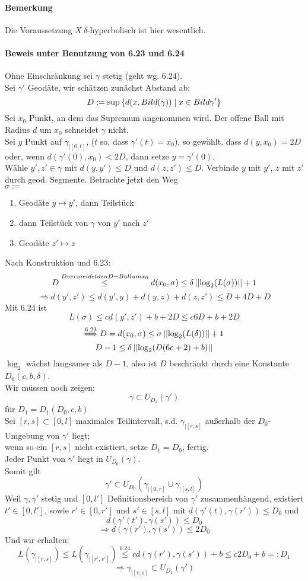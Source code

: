 \documentclass{article}
\begin{document}
\paragraph{Bemerkung} Die Voraussetzung $X ~\delta$-hyperbolisch ist hier wesentlich.

\paragraph{Beweis unter Benutzung von 6.23 und 6.24}
Ohne Einschränkung sei $\gamma$ stetig (geht wg. 6.24).\\
Sei $\gamma'$ Geodäte, wir schätzen zunächst Abstand ab:
\[D:= \sup\set{d(x, Bild(\gamma))}{ x\in Bild\gamma' } \]
Sei $x_0$ Punkt, an dem das Supremum angenommen wird. Der offene Ball mit Radius $d$ um $x_0$ schneidet $\gamma$ nicht.\\
Sei $y$ Punkt auf $\gamma_{|[0,t]}$, ($t$ so, dass $\gamma'(t) = x_0$), so gewählt, dass $d(y,x_0) = 2D$ oder, wenn $d(\gamma'(0), x_0)< 2D$, dann setze $y = \gamma'(0)$.\\
Wähle $y',z' \in \gamma$ mit $d(y,y') \leq D$ und $d(z,z') \leq D$. Verbinde $y$ mit $y'$, $z$ mit $z'$ durch geod. Segmente. Betrachte jetzt den Weg\\
$\sigma := $
\begin{enumerate}
	\item Geodäte $y\mapsto y'$, dann Teilstück  
	\item dann Teilstück von $\gamma$ von $y'$ nach $z'$
	\item Geodäte $z'\mapsto z$
\end{enumerate}
Nach Konstruktion und 6.23:
\[D \overset{D vermeidet den D-Ball um x_0 }{\leq} d(x_0, \sigma) \leq \delta \left|\left|\log_2(L(\sigma))\right|\right| + 1 \]
\[\Longrightarrow d(y',z') \leq d(y',y) + d(y,z) + d(z,z') \leq D + 4D+ D \]
Mit 6.24 ist
\[L(\sigma) \leq cd(y',z') + b + 2D \leq c6D + b +2D\]
\[\overset{6.23}{\Longrightarrow} D = d(x_0, \sigma) \leq \sigma \left|\left|\log_2(L(\delta))\right|\right| + 1 \]
\[ D- 1 \leq \delta \left|\left|\log_2(D(6c + 2) + b)\right|\right| \]
$\log_2$ wächst langsamer als $D-1$, also ist $D$ beschränkt durch eine Konstante $D_0(c,b,\delta)$.\\
Wir müssen noch zeigen: 
\[\gamma \subset U_{D_1}(\gamma') \]
für $D_1 = D_1(D_0, c,b)$\\
Sei $[r,s] \subset [0,l]$ maximales Teilintervall, s.d. $\gamma_{|[r,s]}$ außerhalb der $D_0$-Umgebung von $\gamma'$ liegt;\\
wenn so ein $[r,s]$ nicht existiert, setze $D_1 = D_0$, fertig.\\
Jeder Punkt von $\gamma'$ liegt in $U_{D_0} (\gamma)$.\\
Somit gilt
\[ \gamma' \subset U_{D_0}(\gamma_{|[0,r]} \cup \gamma_{|[s,l]}) \]
Weil $\gamma, \gamma'$ stetig und $[0,l']$ Definitionsbereich von $\gamma'$ zusammenhängend, existiert $t'\in [0,l']$, sowie $r'\in [0,r']$ und $s' \in [s,l]$ mit $d(\gamma'(t), \gamma(r')) \leq D_0$ und
\[ d(\gamma'(t'), \gamma(s')) \leq D_0 \]
\[\Longrightarrow d(\gamma(r'), \gamma(s')) \leq 2D_0 \]
Und wir erhalten: 
\[ L(\gamma_{|[r,s]}) \leq L(\gamma_{|[r',s']}) \overset{6.24}{\leq} cd(\gamma(r'), \gamma(s')) + b \leq c2D_0 + b=:D_1 \]
\[\Longrightarrow \gamma_{|[r,s]} \subset U_{D_1}(\gamma')  \]
\end{document}
